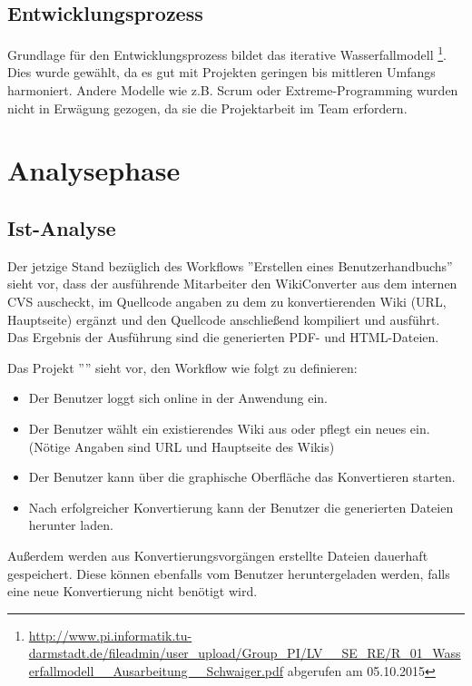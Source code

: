 \documentclass[12pt, xcolor=dvipsnames]{scrartcl}
\begin{document}
\subsection{Entwicklungsprozess}

Grundlage für den Entwicklungsprozess bildet das iterative Wasserfallmodell
\footnote{\url{http://www.pi.informatik.tu-darmstadt.de/fileadmin/user_upload/Group_PI/LV__SE_RE/R_01_Wasserfallmodell__Ausarbeitung__Schwaiger.pdf} abgerufen am 05.10.2015}.
Dies wurde gewählt, da es gut mit Projekten geringen bis mittleren Umfangs harmoniert. Andere Modelle wie z.B. Scrum oder Extreme-Programming wurden nicht in Erwägung gezogen, da sie die Projektarbeit im Team erfordern.

\section{Analysephase}

\subsection{Ist-Analyse}

Der jetzige Stand bezüglich des Workflows ''Erstellen eines Benutzerhandbuchs'' sieht vor, dass der ausführende Mitarbeiter den WikiConverter aus dem internen CVS auscheckt, im Quellcode angaben zu dem zu konvertierenden Wiki (URL, Hauptseite) ergänzt und den Quellcode anschließend kompiliert und ausführt. Das Ergebnis der Ausführung sind die generierten PDF- und HTML-Dateien.

Das Projekt ''\Projekt'' sieht vor, den Workflow wie folgt zu definieren:
\begin{itemize}
	\item Der Benutzer loggt sich online in der Anwendung ein.
	\item Der Benutzer wählt ein existierendes Wiki aus oder pflegt ein neues ein. (Nötige Angaben sind URL und Hauptseite des Wikis)
	\item Der Benutzer kann über die graphische Oberfläche das Konvertieren starten.
	\item Nach erfolgreicher Konvertierung kann der Benutzer die generierten Dateien herunter laden.
\end{itemize}

Außerdem werden aus Konvertierungsvorgängen erstellte Dateien dauerhaft gespeichert. Diese können ebenfalls vom Benutzer heruntergeladen werden, falls eine neue Konvertierung nicht benötigt wird.
\end{document}
